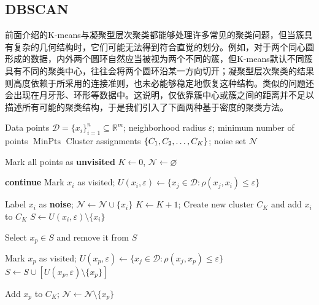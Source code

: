 \subsection{DBSCAN}
前面介绍的K-means与凝聚型层次聚类都能够处理许多常见的聚类问题，但当簇具有复杂的几何结构时，它们可能无法得到符合直觉的划分。例如，对于两个同心圆形成的数据，内外两个圆环自然应当被视为两个不同的簇，但K-means默认不同簇具有不同的聚类中心，往往会将两个圆环沿某一方向切开；凝聚型层次聚类的结果则高度依赖于所采用的连接准则，也未必能够稳定地恢复这种结构。类似的问题还会出现在月牙形、环形等数据中。这说明，仅依靠簇中心或簇之间的距离并不足以描述所有可能的聚类结构，于是我们引入了下面两种基于密度的聚类方法。
\begin{algorithm}[H]
	\caption{DBSCAN (Density-Based Spatial Clustering of Applications with Noise)}
	\label{alg:DBSCAN}
	\begin{algorithmic}[1]
		\Require Data points $\mathcal{D}=\{x_i\}_{i=1}^{n}\subseteq\mathbb{R}^m$;
		neighborhood radius $\varepsilon$;
		minimum number of points $\operatorname{MinPts}$
		\Ensure Cluster assignments $\{C_1, C_2, \dots, C_{K}\}$;
		noise set $\mathcal{N}$
		
		\State Mark all points as \textbf{unvisited}
		\State $K \gets 0$, $\mathcal{N}\gets\varnothing$
		
		\State \textbf{continue}
		\EndIf
		\State Mark $x_i$ as visited; $U(x_i,\varepsilon)\gets\{x_j\in\mathcal{D}:\rho(x_j,x_i)\leqslant\varepsilon\}$
		
		\State Label $x_i$ as \textbf{noise}; $\mathcal{N}\gets\mathcal{N}\cup\{x_i\}$
		\Else
		\State $K\gets K+1$; Create new cluster $C_K$ and add $x_i$ to $C_K$
		\State $S\gets U(x_i,\varepsilon)\setminus\{x_i\}$
		
		\State Select $x_p\in S$ and remove it from $S$
		
		\State Mark $x_p$ as visited; $U(x_p,\varepsilon)\gets\{x_j\in\mathcal{D}:\rho(x_j,x_p)\leqslant\varepsilon\}$
		\State $S\gets S\cup[U(x_p,\varepsilon)\setminus\{x_p\}]$
		\EndIf
		\EndIf
		
		\State Add $x_p$ to $C_K$; $\mathcal{N}\gets\mathcal{N}\setminus\{x_p\}$
		\EndIf
		\EndWhile
		\EndIf
		\EndFor
	\end{algorithmic}
\end{algorithm}
